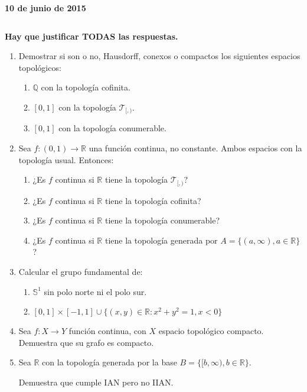 \documentclass[12pt,spanish,a4paper]{article}
\newcommand{\real}[0]{\mathbb{R}}
\newcommand{\rac}[0]{\mathbb{Q}}
\newcommand{\topl}[0]{\mathcal{T}}
\newcommand{\sphere}[0]{\mathbb{S}}
\newcommand{\set}[1]{{\{ #1 \}}}
\newcommand{\appl}[3]{{{#1} : {#2} \rightarrow {#3}}}
\begin{document}

\hfill{\bf 10 de junio de 2015}

$ $

{\bf Hay que justificar TODAS las respuestas.}

\begin{enumerate}[label=\textbf{\arabic*.}]
	\item Demostrar si son o no, Hausdorff, conexos o compactos los siguientes espacios topológicos:
		\begin{enumerate}[label=\textbf{\alph*)}]
			\item $\rac$ con la topología cofinita.

			\item $[0,1]$ con la topología $\topl_{[,)}$.

			\item $[0,1]$ con la topología conumerable.

		\end{enumerate}

	\item Sea $\appl{f}{(0,1)}{\real}$ una función continua, no constante. Ambos espacios con la topología usual. Entonces:
		\begin{enumerate}[label=\textbf{\alph*)}]
			\item ¿Es $f$ continua si $\real$ tiene la topología $\topl_{[,)}$?

			\item ¿Es $f$ continua si $\real$ tiene la topología cofinita?

			\item ¿Es $f$ continua si $\real$ tiene la topología conumerable?

			\item ¿Es $f$ continua si $\real$ tiene la topología generada por $A = \set{(a,\infty), a \in \real}$?

		\end{enumerate}

	\item Calcular el grupo fundamental de:
		\begin{enumerate}[label=\textbf{\alph*)}]
			\item $\sphere^1$ sin polo norte ni el polo sur.

			\item $[0,1]\times[-1,1] \cup \set{(x,y) \in \real : x^2 + y^2 = 1, x < 0}$

		\end{enumerate}

	\item Sea $\appl{f}{X}{Y}$ función continua, con $X$ espacio topológico compacto. Demuestra que su grafo es compacto.

	\item Sea $\real$ con la topología generada por la base $B = \set{[b,\infty), b \in \real}$.

	Demuestra que cumple IAN pero no IIAN.

\end{enumerate}
\end{document}
